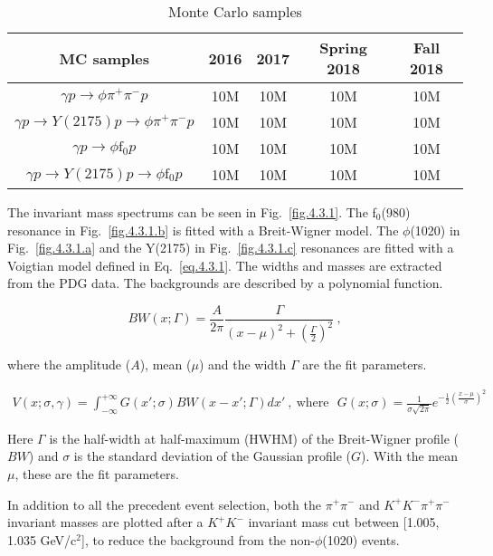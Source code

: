 \begin{table}[H]
    \centering
    \caption{Monte Carlo samples}
    \label{tab.4.3}
    \begin{tabular}{|c|c|c|c|c|}
        \hline
        MC samples & 2016 & 2017 & Spring 2018 & Fall 2018 \\
        \hline
        $\gamma p \rightarrow \phi \pi^+ \pi^- p$ & 10M & 10M & 10M & 10M \\
        \hline
        $\gamma p \rightarrow Y(2175) p \rightarrow \phi \pi^+ \pi^- p$ & 10M & 10M & 10M & 10M \\
        \hline
        $\gamma p \rightarrow \phi \mathrm{f}_0 p$ & 10M & 10M & 10M & 10M \\
        \hline
        $\gamma p \rightarrow Y(2175) p \rightarrow \phi \mathrm{f}_0 p$ & 10M & 10M & 10M & 10M \\
        \hline
    \end{tabular}
\end{table}

The invariant mass spectrums can be seen in Fig.~\ref{fig.4.3.1}. The f$_0$(980) resonance in Fig.~\ref{fig.4.3.1.b} is fitted with a Breit-Wigner model. The $\phi$(1020) in Fig.~\ref{fig.4.3.1.a} and the Y(2175) in Fig.~\ref{fig.4.3.1.c} resonances are fitted with a Voigtian model defined in Eq.~\ref{eq.4.3.1}. The widths and masses are extracted from the PDG data. The backgrounds are described by a polynomial function.

\begin{equation}
    \label{eq.4.3.2}
    BW(x;\Gamma) =  \frac{A}{2\pi}\frac{\Gamma}{(x-\mu)^2+(\frac{\Gamma}{2})^2}~,
\end{equation}

where the amplitude ($A$), mean ($\mu$) and the width $\Gamma$ are the fit parameters.

\begin{equation}
\label{eq.4.3.1}
    \begin{aligned}
        V(x;\sigma,\gamma) = \int_{-\infty}^{+\infty} G(x';\sigma) BW(x-x';\Gamma)dx'~,~\mathrm{where}~~~G(x;\sigma) = \frac{1}{\sigma \sqrt{2\pi}}e^{-\frac{1}{2}(\frac{x-\mu}{\sigma})^2}
    \end{aligned}
\end{equation}

Here $\Gamma$ is the half-width at half-maximum (HWHM) of the Breit-Wigner profile ($BW$) and $\sigma$ is the standard deviation of the Gaussian profile ($G$). With the mean $\mu$, these are the fit parameters.
\par In addition to all the precedent event selection, both the $\pi^+ \pi^-$ and $K^+ K^- \pi^+ \pi^-$ invariant masses are plotted after a $K^+ K^-$ invariant mass cut between [1.005, 1.035 GeV/c$^2$], to reduce the background from the non-$\phi$(1020) events.

